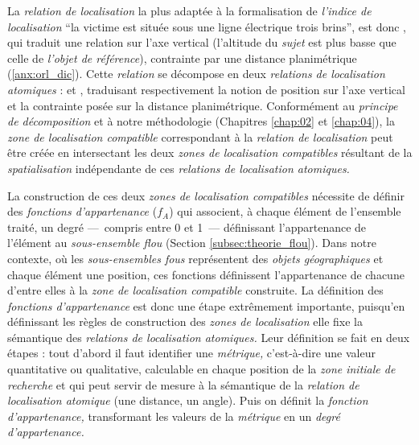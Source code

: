La \emph{relation de localisation} la plus adaptée à la formalisation
de \emph{l'indice de localisation} \enquote{la victime est située sous
  une ligne électrique trois brins}, est donc
, qui traduit une relation sur l'axe
vertical (l'altitude du \emph{sujet} est plus basse que celle de
\emph{l'objet de référence}), contrainte par une distance
planimétrique (\autoref{anx:orl_dic}). Cette \emph{relation} se
décompose en deux \emph{relations de localisation atomiques} :
 et
, traduisant respectivement la notion de position
sur l'axe vertical et la contrainte posée sur la distance
planimétrique. Conformément au \emph{principe de décomposition} et à
notre méthodologie (Chapitres \ref{chap:02} et \ref{chap:04}), la
\emph{zone de localisation compatible} correspondant à la
\emph{relation de localisation}  peut
être créée en intersectant les deux \emph{zones de localisation
  compatibles} résultant de la \emph{spatialisation} indépendante de
ces \emph{relations de localisation atomiques.}

La construction de ces deux \emph{zones de localisation compatibles}
nécessite de définir des \emph{fonctions d'appartenance} ($f_A$) qui
associent, à chaque élément de l'ensemble traité, un degré ---~compris
entre 0 et 1~--- définissant l'appartenance de l'élément au
\emph{sous-ensemble flou} (Section \ref{subsec:theorie_flou}). Dans
notre contexte, où les \emph{sous-ensembles fous} représentent des
\emph{objets géographiques} et chaque élément une position, ces
fonctions définissent l'appartenance de chacune d'entre elles à la
\emph{zone de localisation compatible} construite. La définition des
\emph{fonctions d'appartenance} est donc une étape extrêmement
importante, puisqu'en définissant les règles de construction des
\emph{zones de localisation} elle fixe la sémantique des
\emph{relations de localisation atomiques.} Leur définition se fait en
deux étapes : tout d'abord il faut identifier une \emph{métrique,}
c'est-à-dire une valeur quantitative ou qualitative, calculable en
chaque position de la \emph{zone initiale de recherche} et qui peut
servir de mesure à la sémantique de la \emph{relation de localisation
  atomique} (\eg une distance, un angle). Puis on définit la
\emph{fonction d'appartenance,} transformant les valeurs de la
\emph{métrique} en un \emph{degré d'appartenance.}

